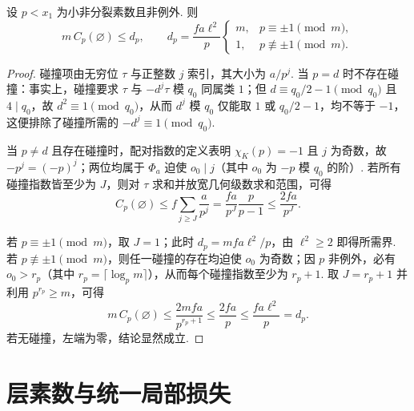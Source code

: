 \begin{lemma}[非例外素数的碰撞损失]
\label{lem:a-nonexceptional-collision}
\emitthmsource
设 $p<x_1$ 为小非分裂素数且非例外. 则
\[
 m\,C_p(\varnothing)\le d_p,\qquad
 d_p=\frac{fa\ell^2}{p}
 \begin{cases}
  m,&p\equiv\pm1\pmod m,\\
  1,&p\not\equiv\pm1\pmod m.
 \end{cases}
\]
\end{lemma}
\begin{proof}
碰撞项由无穷位 $\tau$ 与正整数 $j$ 索引，其大小为 $a/p^j$. 当 $p=d$ 时不存在碰撞：事实上，碰撞要求 $\tau$ 与 $-d^j\tau$ 模 $q_0$ 同属类 $1$；但 $d\equiv q_0/2-1\pmod{q_0}$ 且 $4\mid q_0$，故 $d^2\equiv1\pmod{q_0}$，从而 $d^j$ 模 $q_0$ 仅能取 $1$ 或 $q_0/2-1$，均不等于 $-1$，这便排除了碰撞所需的 $-d^j\equiv1\pmod{q_0}$.

当 $p\ne d$ 且存在碰撞时，配对指数的定义表明 $\chi_K(p)=-1$ 且 $j$ 为奇数，故 $-p^j=(-p)^j$；两位均属于 $\Phi_a$ 迫使 $o_0\mid j$（其中 $o_0$ 为 $-p$ 模 $q_0$ 的阶）. 若所有碰撞指数皆至少为 $J$，则对 $\tau$ 求和并放宽几何级数求和范围，可得
\[
 C_p(\varnothing)
 \le f\sum_{j\ge J}\frac{a}{p^j}
 =\frac{fa}{p^J}\frac{p}{p-1}
 \le\frac{2fa}{p^J}.
\]

若 $p\equiv\pm1\pmod m$，取 $J=1$；此时 $d_p=mfa\ell^2/p$，由 $\ell^2\ge2$ 即得所需界. 若 $p\not\equiv\pm1\pmod m$，则任一碰撞的存在均迫使 $o_0$ 为奇数；因 $p$ 非例外，必有 $o_0>r_p$（其中 $r_p=\lceil\log_p m\rceil$），从而每个碰撞指数至少为 $r_p+1$. 取 $J=r_p+1$ 并利用 $p^{r_p}\ge m$，可得
\[
 m\,C_p(\varnothing)
 \le \frac{2mfa}{p^{r_p+1}}
 \le \frac{2fa}{p}
 \le \frac{fa\ell^2}{p}=d_p.
\]
若无碰撞，左端为零，结论显然成立.
\end{proof}

\section{层素数与统一局部损失}
\label{sec:a-level-prime}

